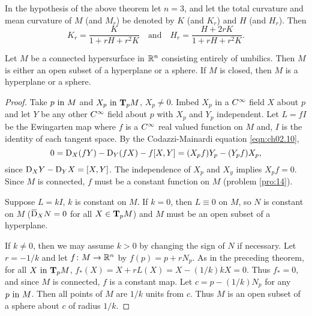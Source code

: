 \documentclass[../main]{subfiles}
\begin{document}
\begin{corollary} \label{cor:ch2.6.2}
In the hypothesis of the above theorem let $n=3$, and let the total curvature and mean curvature of $M$ (and $M_r$) be denoted by $K$ (and $K_r$) and $H$ (and $H_r$). Then
\[ K_r = \frac{K}{1+rH+r^2K} \hspace{1em} \text{and} \hspace{1em} H_r = \frac{H+2rK}{1+rH+r^2K}. \]
\end{corollary}



\begin{theorem} \label{thm:ch2.6.3}
Let $M$ be a connected hypersurface in $\bR^n$ consisting entirely of umbilics. Then $M$ is either an open subset of a hyperplane or a sphere. If $M$ is closed, then $M$ is a hyperplane or a sphere.
\end{theorem}

\begin{proof}
Take $p \InText M$ and $X_p \InText \tangentspace{M}{p}$, $X_p \ne 0$. Imbed $X_p$ in a $\CInfty$ field $X$ about $p$ and let $Y$ be any other $\CInfty$ field about $p$ with $X_p$ and $Y_p$ independent. Let $L = fI$ be the Ewingarten map where $f$ is a $\CInfty$ real valued function on $M$ and, $I$ is the identity of each tangent space. By the Codazzi-Mainardi equation \ref{eqn:ch02.10},
\[ 0 = \connection_X(fY) - \connection_Y(fX)-f[X, Y] = (X_pf)Y_p - (Y_pf)X_p, \]
since $\connection_XY - \connection_YX = [X, Y]$. The independence of $X_p$ and $X_y$ implies $X_pf = 0$. Since $M$ is connected, $f$ must be a constant function on $M$ (problem \ref{pro:14}). 

Suppose $L = kI$, $k$ is constant on $M$. If $k=0$, then $L\equiv 0$ on $M$, so $N$ is constant on $M$ ($\covariant_XN=0$ for all $X\in \tangentspace{M}{p}$) and $M$ must be an open subset of a hyperplane.

If $k\ne 0$, then we may assume $k>0$ by changing the sign of $N$ if necessary. Let $r= -1/k$ and let $f\colon M\functionMaps\bR^n$ by $f(p)=p+rN_p$. As in the preceding theorem, for all $X \InText \tangentspace{M}{p}$, $f_*(X) = X + rL(X) = X - (1/k)kX = 0$. Thus $f_*=0$, and since $M$ is connected, $f$ is a constant map. Let $c = p-(1/k)N_p$ for any $p \InText M$. Then all points of $M$ are $1/k$ units from $c$. Thus $M$ is an open subset of a sphere about $c$ of radius $1/k$. 
\end{proof}
\end{document}

